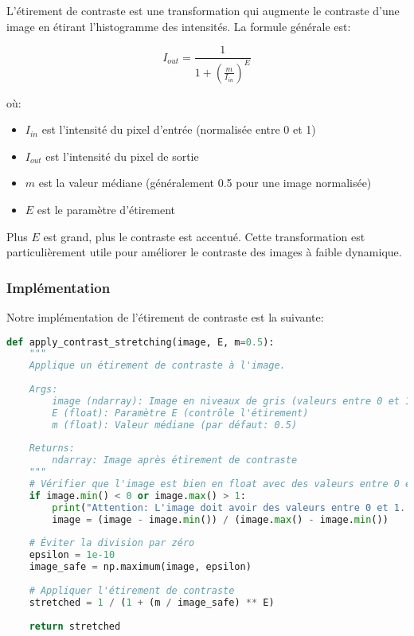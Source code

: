 \documentclass[12pt,a4paper]{article}
\begin{document}
L'étirement de contraste est une transformation qui augmente le contraste d'une image en étirant l'histogramme des intensités. La formule générale est:

\begin{equation}
    I_{out} = \frac{1}{1 + \left(\frac{m}{I_{in}}\right)^E}
\end{equation}

où:
\begin{itemize}
    \item $I_{in}$ est l'intensité du pixel d'entrée (normalisée entre 0 et 1)
    \item $I_{out}$ est l'intensité du pixel de sortie
    \item $m$ est la valeur médiane (généralement 0.5 pour une image normalisée)
    \item $E$ est le paramètre d'étirement
\end{itemize}

Plus $E$ est grand, plus le contraste est accentué. Cette transformation est particulièrement utile pour améliorer le contraste des images à faible dynamique.

\subsubsection{Implémentation}

Notre implémentation de l'étirement de contraste est la suivante:

\begin{lstlisting}[language=Python, caption=Implémentation de l'étirement de contraste]
def apply_contrast_stretching(image, E, m=0.5):
    """
    Applique un étirement de contraste à l'image.
    
    Args:
        image (ndarray): Image en niveaux de gris (valeurs entre 0 et 1)
        E (float): Paramètre E (contrôle l'étirement)
        m (float): Valeur médiane (par défaut: 0.5)
        
    Returns:
        ndarray: Image après étirement de contraste
    """
    # Vérifier que l'image est bien en float avec des valeurs entre 0 et 1
    if image.min() < 0 or image.max() > 1:
        print("Attention: L'image doit avoir des valeurs entre 0 et 1. Normalisation appliquée.")
        image = (image - image.min()) / (image.max() - image.min())
    
    # Éviter la division par zéro
    epsilon = 1e-10
    image_safe = np.maximum(image, epsilon)
    
    # Appliquer l'étirement de contraste
    stretched = 1 / (1 + (m / image_safe) ** E)
    
    return stretched
\end{lstlisting}
\end{document}

